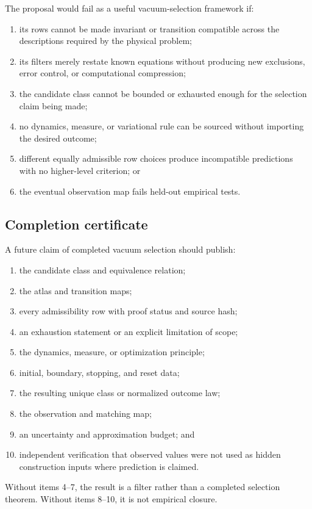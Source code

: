 \documentclass[11pt]{article}
\theoremstyle{definition}
\theoremstyle{remark}
\newcommand{\1}{\mathbf 1}
\begin{document}
The proposal would fail as a useful vacuum-selection framework if:
\begin{enumerate}[leftmargin=2em]
\item its rows cannot be made invariant or transition compatible across
      the descriptions required by the physical problem;
\item its filters merely restate known equations without producing new
      exclusions, error control, or computational compression;
\item the candidate class cannot be bounded or exhausted enough for the
      selection claim being made;
\item no dynamics, measure, or variational rule can be sourced without
      importing the desired outcome;
\item different equally admissible row choices produce incompatible
      predictions with no higher-level criterion; or
\item the eventual observation map fails held-out empirical tests.
\end{enumerate}

\subsection{Completion certificate}

A future claim of completed vacuum selection should publish:
\begin{enumerate}[leftmargin=2em]
\item the candidate class and equivalence relation;
\item the atlas and transition maps;
\item every admissibility row with proof status and source hash;
\item an exhaustion statement or an explicit limitation of scope;
\item the dynamics, measure, or optimization principle;
\item initial, boundary, stopping, and reset data;
\item the resulting unique class or normalized outcome law;
\item the observation and matching map;
\item an uncertainty and approximation budget; and
\item independent verification that observed values were not used as
      hidden construction inputs where prediction is claimed.
\end{enumerate}
Without items 4--7, the result is a filter rather than a completed
selection theorem.  Without items 8--10, it is not empirical closure.
\end{document}
